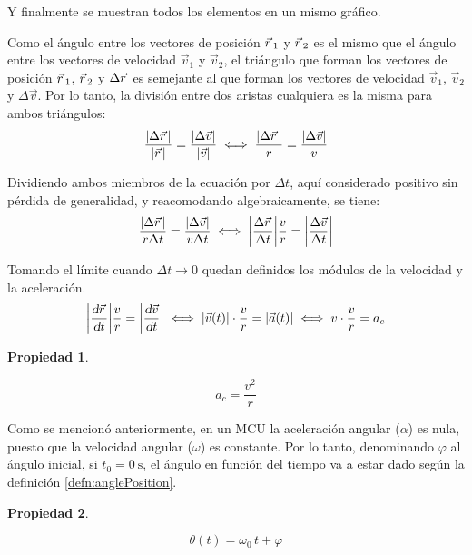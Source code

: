 \documentclass[a5paper,12pt,twoside]{book}
\newtheorem{prop}{{Propiedad}}[chapter]
\begin{document}
Y finalmente se muestran todos los elementos en un mismo gráfico.

\begin{center}
    \def\svgwidth{0.8\linewidth}
    
\end{center}

Como el ángulo entre los vectores de posición $\vec{r}\hspace{0.05cm}_1$ y $\vec{r}\hspace{0.05cm}_2$ es el mismo que el ángulo entre los vectores de velocidad $\Vec{v}_1$ y $\Vec{v}_2$, el triángulo que forman los vectores de posición $\vec{r}\hspace{0.05cm}_1$, $\vec{r}\hspace{0.05cm}_2$ y $\Delta \vec{r}\hspace{0.05cm}$ es semejante al que forman los vectores de velocidad $\Vec{v}_1$, $\Vec{v}_2$ y $\Delta \Vec{v}$.
Por lo tanto, la división entre dos aristas cualquiera es la misma para ambos triángulos:
\[
  \dfrac{{\left| {\Delta\vec{r}\hspace{0.05cm}} \right|}}{{\left| {\vec{r}\hspace{0.05cm}} \right|}} = \dfrac{{\left| {\Delta\Vec{v}} \right|}}{{\left| {\Vec{v}} \right|}}
  \iff
  \dfrac{{\left| {\Delta\vec{r}\hspace{0.05cm}} \right|}}{r} = \dfrac{{\left| {\Delta\Vec{v}} \right|}}{v}
\]

Dividiendo ambos miembros de la ecuación por $\Delta t$, aquí considerado positivo sin pérdida de generalidad, y reacomodando algebraicamente, se tiene:
\[
  \dfrac{{\left| {\Delta\vec{r}\hspace{0.05cm}} \right|}}{r \Delta t} = \dfrac{{\left| {\Delta \Vec{v}} \right|}}{v \Delta t}
  \iff
  {\left| {\dfrac{\Delta \vec{r}\hspace{0.05cm}}{\Delta t}} \right|} \dfrac{v}{r} = {\left| {\dfrac{\Delta \Vec{v}}{\Delta t}} \right|}
\]

Tomando el límite cuando $\Delta t \to 0$ quedan definidos los módulos de la velocidad y la aceleración.
\[
  {\left| {\dfrac{\textsl{d} \vec{r}\hspace{0.05cm}}{\textsl{d} t}} \right|} \dfrac{v}{r} = {\left| {\dfrac{\textsl{d} \Vec{v}}{\textsl{d} t}} \right|}
  \iff
  {\left| {\Vec{v}(t)} \right|} \cdot \dfrac{v}{r} = {\left| {\Vec{a}(t)} \right|}
  \iff
  v \cdot \dfrac{v}{r} = a_c
\]

\begin{mdframed}[style=MyFrame1]
    \begin{prop}
        \label{prop:}
    \end{prop}
    \begin{equation*}
        a_c = \dfrac{v^2}{r}
    \end{equation*}
\end{mdframed}

Como se mencionó anteriormente, en un MCU la aceleración angular ($\alpha$) es nula, puesto que la velocidad angular ($\omega$) es constante.
Por lo tanto, denominando $\varphi$ al ángulo inicial, si $t_0=\SI{0}{\second}$, el ángulo en función del tiempo va a estar dado según la definición \ref{defn:anglePosition}.

\begin{mdframed}[style=MyFrame1]
    \begin{prop}
    \end{prop}
    \begin{equation*}
        \theta (t) = \omega_0 \, t + \varphi
    \end{equation*}
\end{mdframed}
\end{document}
